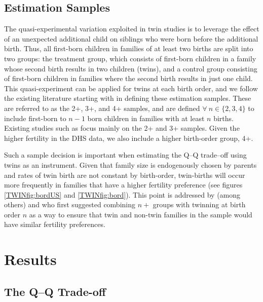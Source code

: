 \documentclass[subeqn]{article}
\begin{document}
\begin{spacing}{1.4}
\subsection{Estimation Samples}                    \label{TWINsscn:samples}
The quasi-experimental variation exploited in twin studies is to leverage the 
effect of an unexpected additional child on siblings who were born before the 
additional birth.  Thus, all first-born children in families of at least two
births are split into two groups: the treatment group, which consists of
first-born children in a family whose second birth results in two children
(twins), and a control group consisting of first-born children in families where
the second birth results in just one child.  This quasi-experiment can be
applied for twins at each birth order, and we follow the existing literature
starting with \citet{Blacketal2005} in defining these estimation samples. These
are referred to as the 2+, 3+, and 4+ samples, and are defined $\forall\ n \in
\{2, 3, 4\}$ to include first-born to $n-1$ born children in families with at
least $n$ births. Existing studies such as \citet{Angristetal2010} focus mainly
on the 2+ and 3+ samples. Given the higher fertility in the DHS data, we also
include a higher birth-order group, 4+.

Such a sample decision is important when estimating the Q--Q trade--off using 
twins as an instrument. Given that family size is endogenously chosen by 
parents and rates of twin birth are not constant by birth-order, twin-births will 
occur more frequently in families that have a higher fertility preference (see
figures \ref{TWINfig:bordUS} and \ref{TWINfig:bord}). This point is addressed by
(among others) \citet{RosenzweigWolpin1980} and \citet{Blacketal2005} who first
suggested combining $n+$ groups with twinning at birth order $n$ as a way to
ensure that twin and non-twin families in the sample would have similar fertility 
preferences.

\section{Results}
\subsection{The Q--Q Trade-off} \label{TWINsscn:QQtwins}

\end{spacing}
\end{document}

